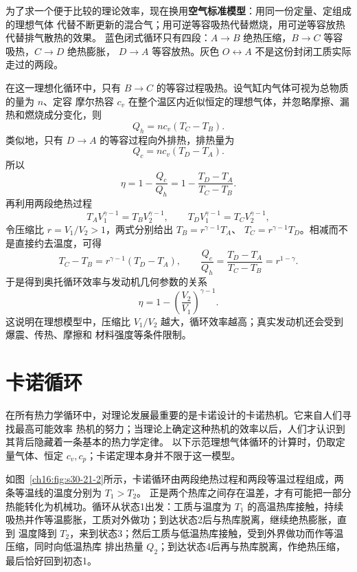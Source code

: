 {为了求一个便于比较的理论效率，现在换用\textbf{空气标准模型}：用同一份定量、定组成的理想气体
代替不断更新的混合气；用可逆等容吸热代替燃烧，用可逆等容放热代替排气散热的效果。
蓝色闭式循环只有四段：$A\to B$ 绝热压缩，$B\to C$ 等容吸热，$C\to D$ 绝热膨胀，
$D\to A$ 等容放热。灰色 $O\leftrightarrow A$ 不是这份封闭工质实际走过的两段。

在这一理想化循环中，只有 $B\to C$ 的等容过程吸热。设气缸内气体可视为总物质的量为 $n$、定容
摩尔热容 $c_v$ 在整个温区内近似恒定的理想气体，并忽略摩擦、漏热和燃烧成分变化，则
\[
  Q_h=n c_v(T_C-T_B).
\]
类似地，只有 $D\to A$ 的等容过程向外排热，排热量为
\[
  Q_c=n c_v(T_D-T_A).
\]
所以
\[
  \eta=1-\frac{Q_c}{Q_h}
  =1-\frac{T_D-T_A}{T_C-T_B}.
\]
再利用两段绝热过程
\[
  T_A V_1^{\gamma-1}=T_B V_2^{\gamma-1},
  \qquad
  T_D V_1^{\gamma-1}=T_C V_2^{\gamma-1},
\]
令压缩比 $r=V_1/V_2>1$，两式分别给出 $T_B=r^{\gamma-1}T_A$、
$T_C=r^{\gamma-1}T_D$。相减而不是直接约去温度，可得
\[
 T_C-T_B=r^{\gamma-1}(T_D-T_A),\qquad
 \frac{Q_c}{Q_h}=\frac{T_D-T_A}{T_C-T_B}=r^{1-\gamma}.
\]
于是得到奥托循环效率与发动机几何参数的关系
\begin{equation}
  \boxed{\eta=1-\left(\frac{V_2}{V_1}\right)^{\gamma-1}}.
\end{equation}
这说明在理想模型中，压缩比 $V_1/V_2$ 越大，循环效率越高；真实发动机还会受到爆震、传热、摩擦和
材料强度等条件限制。

\section{卡诺循环}

在所有热力学循环中，对理论发展最重要的是卡诺设计的卡诺热机。它来自人们寻找最高可能效率
热机的努力；当理论上确定这种热机的效率以后，人们才认识到其背后隐藏着一条基本的热力学定律。
以下示范理想气体循环的计算时，仍取定量气体、恒定 $c_v,c_p$；卡诺定理本身并不限于这一模型。

\par\noindent\begin{minipage}{\linewidth}
\carnotCycleFigure
{}\label{ch16:fig:s30-21-2}
\end{minipage}\par\medskip

如图~\ref{ch16:fig:s30-21-2}所示，卡诺循环由两段绝热过程和两段等温过程组成，两条等温线的温度分别为 $T_1>T_2$。
正是两个热库之间存在温差，才有可能把一部分热能转化为机械功。循环从状态1出发：工质与温度为 $T_1$
的高温热库接触，持续吸热并作等温膨胀，工质对外做功；到达状态2后与热库脱离，继续绝热膨胀，直到
温度降到 $T_2$，来到状态3；然后工质与低温热库接触，受到外界做功而作等温压缩，同时向低温热库
排出热量 $Q_2$；到达状态4后再与热库脱离，作绝热压缩，最后恰好回到初态1。

}
